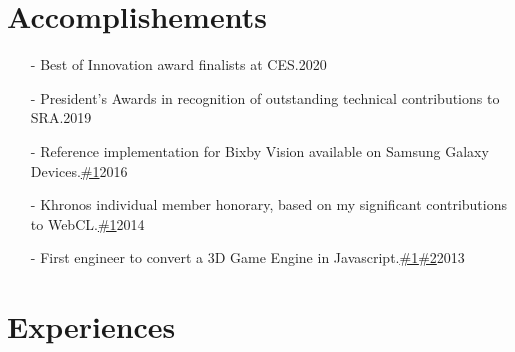 \documentclass[9pt,a4paper,sans]{moderncv}
\newcommand\Colorhref[3][gray]{\href{https://#2}{\scriptsize\color{#1}#3}}
\begin{document}
\begin{scriptsize}
\section{Accomplishements}
\begin{itemize}
	\item[-] Best of Innovation award finalists at CES.\hfill2020
	\item[-] President's Awards in recognition of outstanding technical contributions to SRA.\hfill2019
	\item[-] Reference implementation for Bixby Vision available on Samsung Galaxy Devices.\Colorhref{www.samsung.com/global/galaxy/apps/bixby/vision/}{\#1}\hfill2016
	\item[-] Khronos individual member honorary, based on my significant contributions to WebCL.\Colorhref{www.khronos.org/registry/webcl/specs/latest/1.0/}{\#1}\hfill2014
	\item[-] First engineer to convert a 3D Game Engine in Javascript.\Colorhref{blog.mozilla.org/futurereleases/2013/02/20/one-developer-one-impressive-3d-game-demo-ported-to-the-web-with-no-plugins}{\#1}\Colorhref{anthonyliot.github.io/crypt/}{\#2}\hfill2013
\end{itemize}


\section{Experiences}

\cventry
	{}
	{}
	{}
	{}
	{}
	{}
	{}

\cventry
	{}
	{}
	{}
	{}
	{}
	{}
	{}

\cventry
	{}
	{}
	{}
	{}
	{}
	{}
	{}


\end{scriptsize}
\end{document}
